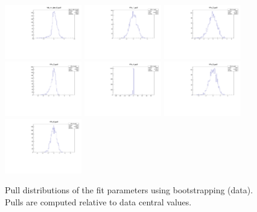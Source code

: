 \begin{figure}[tb]
\begin{center}
	\includegraphics[width=0.3\textwidth]{figs/DataPulls/ds_m_dpe_6_pull.pdf}
	\includegraphics[width=0.3\textwidth]{figs/DataPulls/Fs_1_pull.pdf}
	\includegraphics[width=0.3\textwidth]{figs/DataPulls/Fs_2_pull.pdf}
	\includegraphics[width=0.3\textwidth]{figs/DataPulls/Fs_3_pull.pdf}
	\includegraphics[width=0.3\textwidth]{figs/DataPulls/Fs_4_pull.pdf}
	\includegraphics[width=0.3\textwidth]{figs/DataPulls/Fs_5_pull.pdf}
	\includegraphics[width=0.3\textwidth]{figs/DataPulls/Fs_6_pull.pdf}
   \end{center}
   \caption{
	Pull distributions of the fit parameters using bootstrapping (data).
       Pulls are computed relative to data central values.
   }
   \label{fig:Pulls_Data}
\end{figure}


